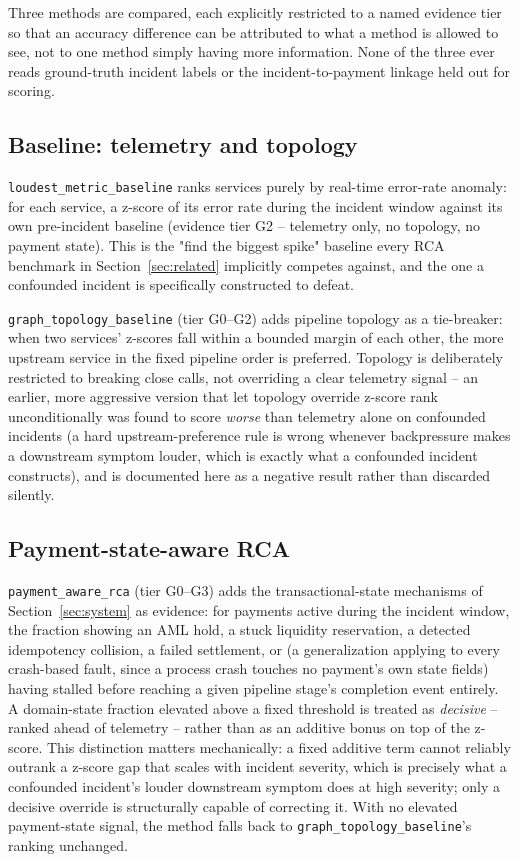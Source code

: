 \documentclass[conference]{IEEEtran}
\begin{document}
Three methods are compared, each explicitly restricted to a named evidence
tier so that an accuracy difference can be attributed to what a method is
allowed to see, not to one method simply having more information. None of
the three ever reads ground-truth incident labels or the incident-to-payment
linkage held out for scoring.

\subsection{Baseline: telemetry and topology}
\texttt{loudest\_metric\_baseline} ranks services purely by real-time
error-rate anomaly: for each service, a z-score of its error rate during the
incident window against its own pre-incident baseline (evidence tier G2 --
telemetry only, no topology, no payment state). This is the "find the
biggest spike" baseline every RCA benchmark in Section~\ref{sec:related}
implicitly competes against, and the one a confounded incident is
specifically constructed to defeat.

\texttt{graph\_topology\_baseline} (tier G0--G2) adds pipeline topology as a
tie-breaker: when two services' z-scores fall within a bounded margin of
each other, the more upstream service in the fixed pipeline order is
preferred. Topology is deliberately restricted to breaking close calls, not
overriding a clear telemetry signal -- an earlier, more aggressive version
that let topology override z-score rank unconditionally was found to score
\emph{worse} than telemetry alone on confounded incidents (a hard
upstream-preference rule is wrong whenever backpressure makes a downstream
symptom louder, which is exactly what a confounded incident constructs),
and is documented here as a negative result rather than discarded silently.

\subsection{Payment-state-aware RCA}
\texttt{payment\_aware\_rca} (tier G0--G3) adds the transactional-state
mechanisms of Section~\ref{sec:system} as evidence: for payments active
during the incident window, the fraction showing an AML hold, a stuck
liquidity reservation, a detected idempotency collision, a failed
settlement, or (a generalization applying to every crash-based fault, since
a process crash touches no payment's own state fields) having stalled
before reaching a given pipeline stage's completion event entirely. A
domain-state fraction elevated above a fixed threshold is treated as
\emph{decisive} -- ranked ahead of telemetry -- rather than as an additive
bonus on top of the z-score. This distinction matters mechanically: a fixed
additive term cannot reliably outrank a z-score gap that scales with
incident severity, which is precisely what a confounded incident's louder
downstream symptom does at high severity; only a decisive override is
structurally capable of correcting it. With no elevated payment-state
signal, the method falls back to \texttt{graph\_topology\_baseline}'s
ranking unchanged.
\end{document}
